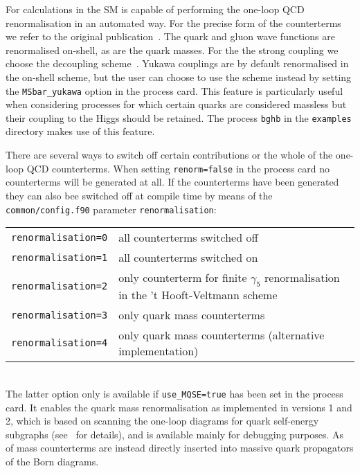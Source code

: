 For calculations in the SM \gosam is capable of performing the one-loop QCD renormalisation in an automated way. For the precise form of the counterterms we refer to the original \gosam publication~\cite{Cullen:2011ac}. The quark and gluon wave functions are renormalised on-shell, as are the quark masses. For the the strong coupling we choose the decoupling scheme~\cite{Bernreuther:1981sg}. Yukawa couplings are by default renormalised in the on-shell scheme, but the user can choose to use the \MSb scheme instead by setting the \texttt{MSbar\_yukawa} option in the process card. This feature is particularly useful when considering processes for which certain quarks are considered massless but their coupling to the Higgs should be retained. The process \texttt{bghb} in the \texttt{examples} directory makes use of this feature.

There are several ways to switch off certain contributions or the whole of the one-loop QCD counterterms. When setting \texttt{renorm=false} in the process card no counterterms will be generated at all. If the counterterms have been generated they can also bee switched off at compile time by means of the \texttt{common/config.f90} parameter \texttt{renormalisation}:\\

\renewcommand{\arraystretch}{1.5}
\begin{tabular}{lp{}}
    \texttt{renormalisation=0} & all counterterms switched off\\
    \texttt{renormalisation=1} & all counterterms switched on\\
    \texttt{renormalisation=2} & only counterterm for finite $\gamma_5$ renormalisation in the 't Hooft-Veltmann scheme\\
    \texttt{renormalisation=3} & only quark mass counterterms\\
    \texttt{renormalisation=4} & only quark mass counterterms (alternative implementation)
\end{tabular}
\renewcommand{\arraystretch}{1.0}\\[10pt]

The latter option only is available if \texttt{use\_MQSE=true} has been set in the process card. It enables the quark mass renormalisation as implemented in \gosam versions 1 and 2, which is based on scanning the one-loop diagrams for quark self-energy subgraphs (see~\cite{Cullen:2011ac} for details), and is available mainly for debugging purposes. As of  mass counterterms are instead directly inserted into massive quark propagators of the Born diagrams.

